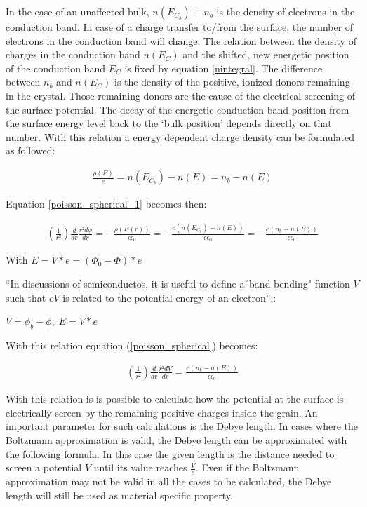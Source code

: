 \documentclass[11pt]{article}
\begin{document}
In the case of an unaffected bulk, \(n(E_{C_{b}})\equiv n_{b}\) is the
density of electrons in the conduction band. In case of a charge
transfer to/from the surface, the number of electrons in the conduction
band will change. The relation between the density of charges in the
conduction band \(n(E_{C})\) and the shifted, new energetic position of
the conduction band \(E_{C}\) is fixed by equation \ref{nintegral}. The
difference between \(n_{b}\) and \(n(E_{C})\) is the density of the
positive, ionized donors remaining in the crystal. Those remaining
donors are the cause of the electrical screening of the surface
potential. The decay of the energetic conduction band position from the
surface energy level back to the `bulk position' depends directly on
that number. With this relation a energy dependent charge density can be
formulated as followed:

\begin{align}
\frac{\rho(E)}{e}=n(E_{C_b})-n(E) = n_{b}-n(E)
\end{align}

Equation \ref{poisson_spherical_1} becomes then:

\begin{align}
\left(\frac{1}{r²}\right)\frac{d}{dr}\frac{r²d\phi}{dr}=-\frac{\rho\left(E\left(r\right)\right)}{\epsilon\epsilon_{0}}=-\frac{e\left(n\left(E_{C_{b}}\right)-n\left(E\right)\right)}{\epsilon\epsilon_{0}}=-\frac{e\left(n_{b}-n\left(E\right)\right)}{\epsilon\epsilon_{0}}\label{poisson_spherical}\tag{Poisson spherical 2}
\end{align}

With \(E=V*e=(\Phi_{0}-\Phi)*e\)

``In discussions of semiconductos, it is useful to define a''band
bending" function \(V\) such that \(eV\) is related to the potential
energy of an electron''\cite{S.RoyMorrison1977}::

\(V=\phi_{b}-\phi,\;E=V*e\)

With this relation equation (\ref{poisson_spherical}) becomes:

\begin{align}
\left(\frac{1}{r²}\right)\frac{d}{dr}\frac{r²dV}{dr}=\frac{e\left(n_{b}-n\left(E\right)\right)}{\epsilon\epsilon_{0}}\label{poisson_spher_v}\tag{Poisson spherical (V)}
\end{align}

With this relation is is possible to calculate how the potential at the
surface is electrically screen by the remaining positive charges inside
the grain. An important parameter for such calculations is the Debye
length. In cases where the Boltzmann approximation is valid, the Debye
length can be approximated with the following formula. In this case the
given length is the distance needed to screen a potential \(V\) until
its value reaches \(\frac{V}{e}\). Even if the Boltzmann approximation
may not be valid in all the cases to be calculated, the Debye length
will still be used as material specific property.
\end{document}
